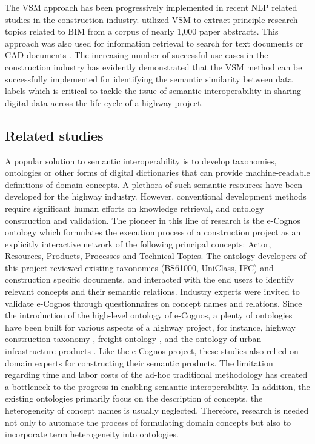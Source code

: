 \documentclass[Journal, BackFigs,NoLists, DoubleSpace]{ascelike}%
\begin{document}
%
\par
The VSM approach has been progressively implemented in recent NLP related studies in the construction industry.  utilized VSM to extract principle research topics related to BIM from a corpus of nearly 1,000 paper abstracts. This approach was also used for information retrieval to search for text documents \cite{lv15} or CAD documents \cite{hsu13}. The increasing number of successful use cases in the construction industry has evidently demonstrated that the VSM method can be successfully implemented for identifying the semantic similarity between data labels which is critical to tackle the issue of semantic interoperability in sharing digital data across the life cycle of a highway project.
%
\subsection{Related studies}
% 
A popular solution to semantic interoperability is to develop taxonomies, ontologies or other forms of digital dictionaries that can provide machine-readable definitions of domain concepts. A plethora of such semantic resources have been developed for the highway industry. However, conventional development methods require significant human efforts on knowledge retrieval, and ontology construction and validation. The pioneer in this line of research is the e-Cognos ontology \cite{wetherill02,lima05} which formulates the execution process of a construction project as an explicitly interactive network of the following principal concepts: Actor, Resources, Products, Processes and Technical Topics. The ontology developers of this project reviewed existing taxonomies (BS61000, UniClass, IFC) and construction specific documents, and interacted with the end users to identify relevant concepts and their semantic relations. Industry experts were invited to validate e-Cognos through questionnaires on concept names and relations. Since the introduction of the high-level ontology of e-Cognos, a plenty of ontologies have been built for various aspects of a highway project, for instance, highway construction taxonomy \cite{el-diraby05,el-diraby05b}, freight ontology \cite{seedah15}, and the ontology of urban infrastructure products \cite{osman06}. Like the e-Cognos project, these studies also relied on domain experts for constructing their semantic products. The limitation regarding time and labor costs of the ad-hoc traditional methodology has created a bottleneck to the progress in enabling semantic interoperability. In addition, the existing ontologies primarily focus on the description of concepts, the heterogeneity of concept names is usually neglected. Therefore, research is needed not only to automate the process of formulating domain concepts but also to incorporate term heterogeneity into ontologies.
\end{document}
